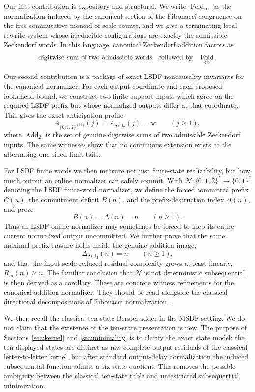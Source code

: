\documentclass[11pt,letterpaper]{article}
\numberwithin{equation}{section}
\theoremstyle{plain}
\theoremstyle{definition}
\theoremstyle{remark}
\newcommand{\NN}{\mathbb{N}}
\DeclareMathOperator{\Fold}{Fold}
\newcommand{\AddTwo}{\operatorname{Add}_{2}}
\begin{document}
Our first contribution is expository and structural.  We write
$\Fold_\infty$ as the normalization induced by the canonical section of the
Fibonacci congruence on the free commutative monoid of scale counts, and we give a terminating local
rewrite system whose irreducible configurations are exactly the admissible
Zeckendorf words.  In this language, canonical Zeckendorf addition factors as
\[
\text{digitwise sum of two admissible words}
\quad\hbox{followed by}\quad
\Fold_\infty .
\]

Our second contribution is a package of exact LSDF noncausality invariants for
the canonical normalizer.  For each output coordinate and each proposed
lookahead bound, we construct two finite-support inputs which agree on the
required LSDF prefix but whose normalized outputs differ at that coordinate.
This gives the exact anticipation profile
\[
A_{\{0,1,2\}^{(\NN)}}(j)=A_{\AddTwo}(j)=\infty
\qquad (j\ge 1),
\]
where $\AddTwo$ is the set of genuine digitwise sums of two admissible
Zeckendorf inputs.  The same witnesses show that no continuous extension
exists at the alternating one-sided limit tails.

For LSDF finite words we then measure not just finite-state realizability, but
how much output an online normalizer can safely commit.  With
$\mathcal N:\{0,1,2\}^\ast\to\{0,1\}^\ast$ denoting the LSDF finite-word
normalizer, we define the forced committed prefix $C(u)$, the commitment
deficit $B(n)$, and the prefix-destruction index $\Delta(n)$, and prove
\[
B(n)=\Delta(n)=n\qquad (n\ge 1).
\]
Thus an LSDF online normalizer may sometimes be forced to keep its entire
current normalized output uncommitted.  We further prove that the same maximal
prefix erasure holds inside the genuine addition image,
\[
\Delta_{\AddTwo}(n)=n\qquad (n\ge 1),
\]
and that the input-scale reduced residual complexity grows at least linearly,
$R_{\mathrm{in}}(n)\ge n$.  The familiar conclusion that $\mathcal N$ is not
deterministic subsequential is then derived as a corollary.  These are concrete witness
refinements for the canonical addition normalizer.  They should be read
alongside the classical directional decompositions of Fibonacci normalization
\cite{Frougny1992NumbersAutomata,Sakarovitch1987EasyMultiplications}.

We then recall the classical ten-state Berstel adder in the MSDF setting.  We
do not claim that the existence of the ten-state presentation is new.  The
purpose of Sections~\ref{sec:kernel} and \ref{sec:minimality} is to clarify
the exact state model: the ten displayed states are distinct as raw
complete-output residuals of the classical letter-to-letter kernel, but after
standard output-delay normalization the induced subsequential function admits
a six-state quotient.  This removes the possible ambiguity between the
classical ten-state table and unrestricted subsequential minimization.
\end{document}
